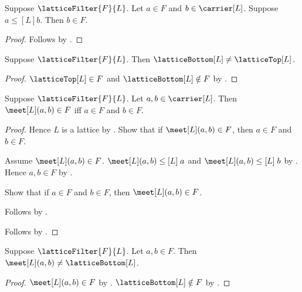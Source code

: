 \begin{proposition}\label{lattice_filter_upward}
    Suppose $\latticeFilter{F}{L}$.
    Let $a\in F$ and $b\in\carrier[L]$.
    Suppose $a\mathrel{\leq[L]}b$.
    Then $b\in F$.
\end{proposition}
\begin{proof}
    Follows by .
\end{proof}

\begin{proposition}\label{lattice_filter_implies_bottom_ne_top}
    Suppose $\latticeFilter{F}{L}$.
    Then $\latticeBottom[L]\neq\latticeTop[L]$.
\end{proposition}
\begin{proof}
    $\latticeTop[L]\in F$ and $\latticeBottom[L]\notin F$ by
        .
\end{proof}

\begin{proposition}\label{lattice_filter_meet_in_iff}
    Suppose $\latticeFilter{F}{L}$.
    Let $a,b\in\carrier[L]$.
    Then $\meet[L](a,b)\in F$ iff $a\in F$ and $b\in F$.
\end{proposition}
\begin{proof}
    Hence $L$ is a lattice by .
    Show that if $\meet[L](a,b)\in F$, then $a\in F$ and $b\in F$.
    \begin{subproof}
        Assume $\meet[L](a,b)\in F$.
        $\meet[L](a,b)\mathrel{\leq[L]}a$ and
            $\meet[L](a,b)\mathrel{\leq[L]}b$ by .
        Hence $a,b\in F$ by .
    \end{subproof}
    Show that if $a\in F$ and $b\in F$, then
        $\meet[L](a,b)\in F$.
    \begin{subproof}
        Follows by .
    \end{subproof}
    Follows by \auto.
\end{proof}

\begin{proposition}\label{lattice_filter_no_bottom_meet}
    Suppose $\latticeFilter{F}{L}$.
    Let $a,b\in F$.
    Then $\meet[L](a,b)\neq\latticeBottom[L]$.
\end{proposition}
\begin{proof}
    $\meet[L](a,b)\in F$ by .
    $\latticeBottom[L]\notin F$ by
        .
\end{proof}

